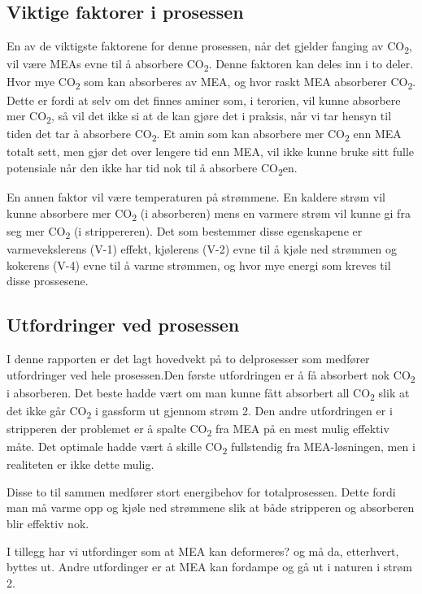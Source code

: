 \subsection{Viktige faktorer i prosessen}
En av de viktigste faktorene for denne prosessen, når det gjelder fanging av CO\textsubscript{2}, vil være MEAs evne til å absorbere CO\textsubscript{2}. Denne faktoren kan deles inn i to deler. Hvor mye CO\textsubscript{2} som kan absorberes av MEA, og hvor raskt MEA absorberer CO\textsubscript{2}. Dette er fordi at selv om det finnes aminer som, i terorien, vil kunne absorbere mer CO\textsubscript{2}, så vil det ikke si at de kan gjøre det i praksis, når vi tar hensyn til tiden det tar å absorbere CO\textsubscript{2}. Et amin som kan absorbere mer CO\textsubscript{2} enn MEA totalt sett, men gjør det over lengere tid enn MEA, vil ikke kunne bruke sitt fulle potensiale når den ikke har tid nok til å absorbere CO\textsubscript{2}en. 

En annen faktor vil være temperaturen på strømmene. En kaldere strøm vil kunne absorbere mer CO\textsubscript{2} (i absorberen) mens en varmere strøm vil kunne gi fra seg mer CO\textsubscript{2} (i strippereren). Det som bestemmer disse egenskapene er varmevekslerens (V-1) effekt, kjølerens (V-2) evne til å kjøle ned strømmen og kokerens (V-4) evne til å varme strømmen, og hvor mye energi som kreves til disse prossesene. 

\subsection{Utfordringer ved prosessen}
I denne rapporten er det lagt hovedvekt på to delprosesser som medfører utfordringer ved hele prosessen.Den første utfordringen er å få absorbert nok CO\textsubscript{2} i absorberen. Det beste hadde vært om man kunne fått absorbert all CO\textsubscript{2} slik at det ikke går CO\textsubscript{2} i gassform ut gjennom strøm 2. Den andre utfordringen er i stripperen der problemet er å spalte CO\textsubscript{2} fra MEA på en mest mulig effektiv måte. Det optimale hadde vært å skille CO\textsubscript{2} fullstendig fra MEA-løsningen, men i realiteten er ikke dette mulig. 

Disse to til sammen medfører stort energibehov for totalprosessen. Dette fordi man må varme opp og kjøle ned strømmene slik at både stripperen og absorberen blir effektiv nok. 

I tillegg har vi utfordinger som at MEA kan deformeres? og må da, etterhvert, byttes ut. Andre utfordinger er at MEA kan fordampe og gå ut i naturen i strøm 2. 
